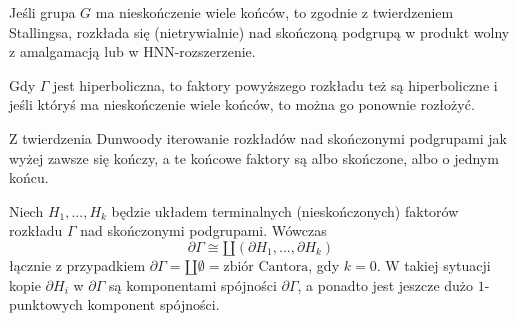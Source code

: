 Jeśli grupa $G$ ma nieskończenie wiele końców, to zgodnie z twierdzeniem Stallingsa, rozkłada się (nietrywialnie) nad skończoną podgrupą w produkt wolny z amalgamacją lub w HNN-rozszerzenie.

Gdy $\Gamma$ jest hiperboliczna, to faktory powyższego rozkładu też są hiperboliczne i jeśli któryś ma nieskończenie wiele końców, to można go ponownie rozłożyć.

Z twierdzenia Dunwoody iterowanie rozkładów nad skończonymi podgrupami jak wyżej zawsze się kończy, a te końcowe faktory są albo skończone, albo o jednym końcu.

Niech $H_1,...,H_k$ będzie układem terminalnych (nieskończonych) faktorów rozkładu $\Gamma$ nad skończonymi podgrupami. Wówczas
$$\partial\Gamma\cong\amalg(\partial H_1,...,\partial H_k)$$
łącznie z przypadkiem $\partial\Gamma=\amalg\emptyset=\text{zbiór Cantora}$, gdy $k=0$.
W takiej sytuacji kopie $\partial H_i$ w $\partial \Gamma$ są komponentami spójności $\partial\Gamma$, a ponadto jest jeszcze dużo $1$-punktowych komponent spójności.




